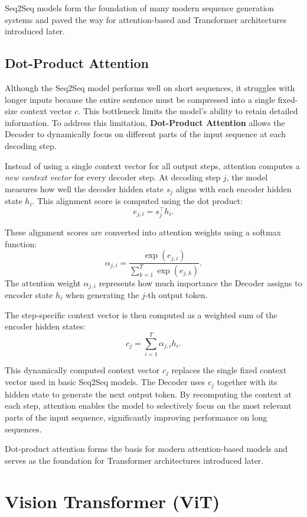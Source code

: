 \documentclass{article}
\begin{document}
Seq2Seq models form the foundation of many modern sequence generation systems and paved the way for attention-based and Transformer architectures introduced later.

\subsection{Dot-Product Attention}

Although the Seq2Seq model performs well on short sequences, it struggles with longer inputs because the entire sentence must be compressed into a single fixed-size context vector \( c \). This bottleneck limits the model’s ability to retain detailed information. To address this limitation, \textbf{Dot-Product Attention} allows the Decoder to dynamically focus on different parts of the input sequence at each decoding step.

Instead of using a single context vector for all output steps, attention computes a \emph{new context vector} for every decoder step. At decoding step \( j \), the model measures how well the decoder hidden state \( s_j \) aligns with each encoder hidden state \( h_i \). This alignment score is computed using the dot product:
\[
e_{j,i} = s_j^{\top} h_i.
\]

These alignment scores are converted into attention weights using a softmax function:
\[
\alpha_{j,i} = 
\frac{\exp(e_{j,i})}
{\sum_{k=1}^{T} \exp(e_{j,k})}.
\]
The attention weight \( \alpha_{j,i} \) represents how much importance the Decoder assigns to encoder state \( h_i \) when generating the \( j \)-th output token.

The step-specific context vector is then computed as a weighted sum of the encoder hidden states:
\[
c_j = \sum_{i=1}^{T} \alpha_{j,i} h_i.
\]

This dynamically computed context vector \( c_j \) replaces the single fixed context vector used in basic Seq2Seq models. The Decoder uses \( c_j \) together with its hidden state to generate the next output token. By recomputing the context at each step, attention enables the model to selectively focus on the most relevant parts of the input sequence, significantly improving performance on long sequences.

Dot-product attention forms the basis for modern attention-based models and serves as the foundation for Transformer architectures introduced later.

\section{Vision Transformer (ViT)}
\end{document}
